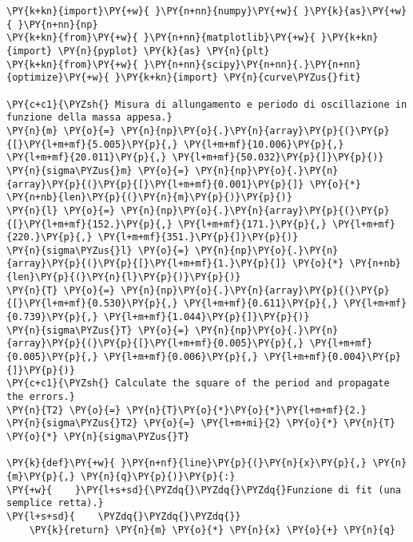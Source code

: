 \begin{Verbatim}[label=\makebox{\href{https://github.com/unipi-physics-labs/lab1-sheets/tree/main/snippy/misura_di_g.py}{https://github.com/.../misura\_di\_g.py}},commandchars=\\\{\}]
\PY{k+kn}{import}\PY{+w}{ }\PY{n+nn}{numpy}\PY{+w}{ }\PY{k}{as}\PY{+w}{ }\PY{n+nn}{np}
\PY{k+kn}{from}\PY{+w}{ }\PY{n+nn}{matplotlib}\PY{+w}{ }\PY{k+kn}{import} \PY{n}{pyplot} \PY{k}{as} \PY{n}{plt}
\PY{k+kn}{from}\PY{+w}{ }\PY{n+nn}{scipy}\PY{n+nn}{.}\PY{n+nn}{optimize}\PY{+w}{ }\PY{k+kn}{import} \PY{n}{curve\PYZus{}fit}

\PY{c+c1}{\PYZsh{} Misura di allungamento e periodo di oscillazione in funzione della massa appesa.}
\PY{n}{m} \PY{o}{=} \PY{n}{np}\PY{o}{.}\PY{n}{array}\PY{p}{(}\PY{p}{[}\PY{l+m+mf}{5.005}\PY{p}{,} \PY{l+m+mf}{10.006}\PY{p}{,} \PY{l+m+mf}{20.011}\PY{p}{,} \PY{l+m+mf}{50.032}\PY{p}{]}\PY{p}{)}
\PY{n}{sigma\PYZus{}m} \PY{o}{=} \PY{n}{np}\PY{o}{.}\PY{n}{array}\PY{p}{(}\PY{p}{[}\PY{l+m+mf}{0.001}\PY{p}{]} \PY{o}{*} \PY{n+nb}{len}\PY{p}{(}\PY{n}{m}\PY{p}{)}\PY{p}{)}
\PY{n}{l} \PY{o}{=} \PY{n}{np}\PY{o}{.}\PY{n}{array}\PY{p}{(}\PY{p}{[}\PY{l+m+mf}{152.}\PY{p}{,} \PY{l+m+mf}{171.}\PY{p}{,} \PY{l+m+mf}{220.}\PY{p}{,} \PY{l+m+mf}{351.}\PY{p}{]}\PY{p}{)}
\PY{n}{sigma\PYZus{}l} \PY{o}{=} \PY{n}{np}\PY{o}{.}\PY{n}{array}\PY{p}{(}\PY{p}{[}\PY{l+m+mf}{1.}\PY{p}{]} \PY{o}{*} \PY{n+nb}{len}\PY{p}{(}\PY{n}{l}\PY{p}{)}\PY{p}{)}
\PY{n}{T} \PY{o}{=} \PY{n}{np}\PY{o}{.}\PY{n}{array}\PY{p}{(}\PY{p}{[}\PY{l+m+mf}{0.530}\PY{p}{,} \PY{l+m+mf}{0.611}\PY{p}{,} \PY{l+m+mf}{0.739}\PY{p}{,} \PY{l+m+mf}{1.044}\PY{p}{]}\PY{p}{)}
\PY{n}{sigma\PYZus{}T} \PY{o}{=} \PY{n}{np}\PY{o}{.}\PY{n}{array}\PY{p}{(}\PY{p}{[}\PY{l+m+mf}{0.005}\PY{p}{,} \PY{l+m+mf}{0.005}\PY{p}{,} \PY{l+m+mf}{0.006}\PY{p}{,} \PY{l+m+mf}{0.004}\PY{p}{]}\PY{p}{)}
\PY{c+c1}{\PYZsh{} Calculate the square of the period and propagate the errors.}
\PY{n}{T2} \PY{o}{=} \PY{n}{T}\PY{o}{*}\PY{o}{*}\PY{l+m+mf}{2.}
\PY{n}{sigma\PYZus{}T2} \PY{o}{=} \PY{l+m+mi}{2} \PY{o}{*} \PY{n}{T} \PY{o}{*} \PY{n}{sigma\PYZus{}T}

\PY{k}{def}\PY{+w}{ }\PY{n+nf}{line}\PY{p}{(}\PY{n}{x}\PY{p}{,} \PY{n}{m}\PY{p}{,} \PY{n}{q}\PY{p}{)}\PY{p}{:}
\PY{+w}{    }\PY{l+s+sd}{\PYZdq{}\PYZdq{}\PYZdq{}Funzione di fit (una semplice retta).}
\PY{l+s+sd}{    \PYZdq{}\PYZdq{}\PYZdq{}}
    \PY{k}{return} \PY{n}{m} \PY{o}{*} \PY{n}{x} \PY{o}{+} \PY{n}{q}


\end{Verbatim}
